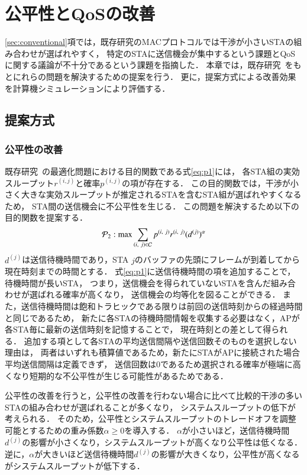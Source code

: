 \documentclass[technicalreport]{ieicej}
\newcommand{\sij}{(i,j)}
\newcommand{\pij}{p^{(i,j)}}
\newcommand{\rij}{r^{\sij}}
\begin{document}
\section{公平性とQoSの改善}
	\ref{sec:conventional}項では，既存研究のMACプロトコルでは干渉が小さいSTAの組み合わせが選ばれやすく，
	特定のSTAに送信機会が集中するという課題とQoSに関する議論が不十分であるという課題を指摘した．
	本章では，既存研究~\cite{promac}をもとにれらの問題を解決するための提案を行う．
	更に，提案方式による改善効果を計算機シミュレーションにより評価する．
	\subsection{提案方式}\label{sec:ufd_propose}
		\subsubsection{公平性の改善}\label{sec:fair}
			既存研究~\cite{promac}の最適化問題における目的関数である式\eqref{eq:p1}には，
			各STA組の実効スループット$\rij$と確率$\pij$の項が存在する．
			この目的関数では，干渉が小さく大きな実効スループットが推定されるSTAを含むSTA組が選ばれやすくなるため，
			STA間の送信機会に不公平性を生じる．
			この問題を解決するため以下の目的関数を提案する．
			\begin{equation}
				{\mathcal P}_2: {\rm max} \sum_{(i,\ j)\in{\mathcal C}} p^{(i,\ j)}r^{(i,\ j)}(d^{(j)})^{\alpha} 	\label{eq:p2}
			\end{equation}
			$d^{(j)}$は送信待機時間であり，STA $j$のバッファの先頭にフレームが到着してから現在時刻までの時間とする．
			式\eqref{eq:p1}に送信待機時間の項を追加することで，待機時間が長いSTA，
			つまり，送信機会を得られていないSTAを含んだ組み合わせが選ばれる確率が高くなり，
			送信機会の均等化を図ることができる．
			また，送信待機時間は飽和トラヒックである限りは前回の送信時刻からの経過時間と同じであるため，
			新たに各STAの待機時間情報を収集する必要はなく，APが各STA毎に最新の送信時刻を記憶することで，
			現在時刻との差として得られる．
			追加する項として各STAの平均送信間隔や送信回数そのものを選択しない理由は，
			両者はいずれも積算値であるため，新たにSTAがAPに接続された場合平均送信間隔は定義できず，
			送信回数は0であるため選択される確率が極端に高くなり短期的な不公平性が生じる可能性があるためである．
			\par
			公平性の改善を行うと，公平性の改善を行わない場合に比べて比較的干渉の多いSTAの組み合わせが選ばれることが多くなり，
			システムスループットの低下が考えられる．
			そのため，公平性とシステムスループットのトレードオフを調整可能とするための重み係数$\alpha\geq 0$を導入する．
			$\alpha$が小さいほど，送信待機時間$d^{(j)}$の影響が小さくなり，システムスループットが高くなり公平性は低くなる．
			逆に，$\alpha$が大きいほど送信待機時間$d^{(j)}$の影響が大きくなり，公平性が高くなるがシステムスループットが低下する．
\end{document}
